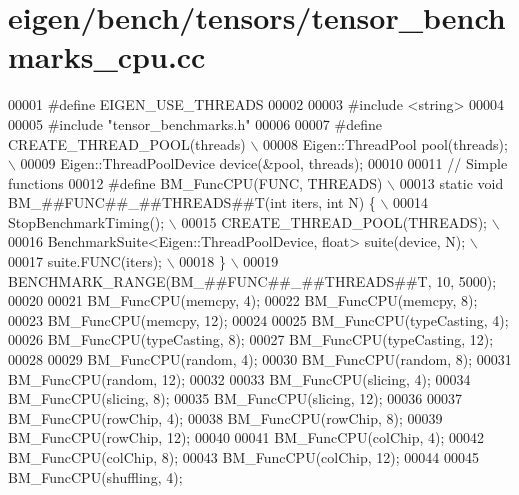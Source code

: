 \hypertarget{eigen_2bench_2tensors_2tensor__benchmarks__cpu_8cc_source}{}\section{eigen/bench/tensors/tensor\+\_\+benchmarks\+\_\+cpu.cc}
\label{eigen_2bench_2tensors_2tensor__benchmarks__cpu_8cc_source}

\begin{DoxyCode}
00001 \textcolor{preprocessor}{#define EIGEN\_USE\_THREADS}
00002 
00003 \textcolor{preprocessor}{#include <string>}
00004 
00005 \textcolor{preprocessor}{#include "tensor\_benchmarks.h"}
00006 
00007 \textcolor{preprocessor}{#define CREATE\_THREAD\_POOL(threads)             \(\backslash\)}
00008 \textcolor{preprocessor}{Eigen::ThreadPool pool(threads);                \(\backslash\)}
00009 \textcolor{preprocessor}{Eigen::ThreadPoolDevice device(&pool, threads);}
00010 
00011 \textcolor{comment}{// Simple functions}
00012 \textcolor{preprocessor}{#define BM\_FuncCPU(FUNC, THREADS)                                    \(\backslash\)}
00013 \textcolor{preprocessor}{  static void BM\_##FUNC##\_##THREADS##T(int iters, int N) \{           \(\backslash\)}
00014 \textcolor{preprocessor}{    StopBenchmarkTiming();                                           \(\backslash\)}
00015 \textcolor{preprocessor}{    CREATE\_THREAD\_POOL(THREADS);                                     \(\backslash\)}
00016 \textcolor{preprocessor}{    BenchmarkSuite<Eigen::ThreadPoolDevice, float> suite(device, N); \(\backslash\)}
00017 \textcolor{preprocessor}{    suite.FUNC(iters);                                               \(\backslash\)}
00018 \textcolor{preprocessor}{  \}                                                                  \(\backslash\)}
00019 \textcolor{preprocessor}{  BENCHMARK\_RANGE(BM\_##FUNC##\_##THREADS##T, 10, 5000);}
00020 
00021 BM\_FuncCPU(memcpy, 4);
00022 BM\_FuncCPU(memcpy, 8);
00023 BM\_FuncCPU(memcpy, 12);
00024 
00025 BM\_FuncCPU(typeCasting, 4);
00026 BM\_FuncCPU(typeCasting, 8);
00027 BM\_FuncCPU(typeCasting, 12);
00028 
00029 BM\_FuncCPU(random, 4);
00030 BM\_FuncCPU(random, 8);
00031 BM\_FuncCPU(random, 12);
00032 
00033 BM\_FuncCPU(slicing, 4);
00034 BM\_FuncCPU(slicing, 8);
00035 BM\_FuncCPU(slicing, 12);
00036 
00037 BM\_FuncCPU(rowChip, 4);
00038 BM\_FuncCPU(rowChip, 8);
00039 BM\_FuncCPU(rowChip, 12);
00040 
00041 BM\_FuncCPU(colChip, 4);
00042 BM\_FuncCPU(colChip, 8);
00043 BM\_FuncCPU(colChip, 12);
00044 
00045 BM\_FuncCPU(shuffling, 4);

\end{DoxyCode}
